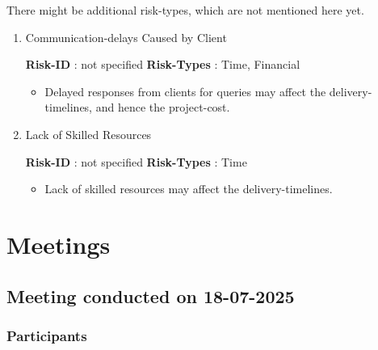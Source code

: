 \documentclass{article}%
\makeatletter
\newcommand{\tinytosmall}{%
  \fontsize
    {\fpeval{(\f@size@tiny+\f@size@small)/2}}
    {\fpeval{(\f@baselineskip@tiny+\f@baselineskip@small)/2}}%
  \selectfont
}
\newcommand{\savecurrentfontsize}{\let\savedlastfontsize\@currsize}
\makeatother
\begin{document}
%
\par%
\savecurrentfontsize%
\begin{mdframed}[style=StopFrame,skipabove=\baselineskip]%
There might be additional risk{-}types, which are not mentioned here yet.%
\end{mdframed}%
\savedlastfontsize%
\begin{enumerate}%
\item%
\hypertarget{ID:885652931}{}%
Communication{-}delays Caused by Client%
\begin{fancybox}{\small \faChevronCircleRight \normalsize \xspace %
\tinytosmall%
\textbf{Risk{-}ID}%
: %
\xspace%
\faChevronLeft not specified\faChevronRight%
\normalsize%
}%
\tinytosmall%
\textbf{Risk{-}Types}%
: %
\xspace%
Time, Financial%
\normalsize%
\begin{itemize}%
\item%
Delayed responses from clients for queries may affect the delivery{-}timelines, and hence the project{-}cost.%
\end{itemize}%
\end{fancybox}%
\item%
\hypertarget{ID:1977501014}{}%
Lack of Skilled Resources%
\begin{fancybox}{\small \faChevronCircleRight \normalsize \xspace %
\tinytosmall%
\textbf{Risk{-}ID}%
: %
\xspace%
\faChevronLeft not specified\faChevronRight%
\normalsize%
}%
\tinytosmall%
\textbf{Risk{-}Types}%
: %
\xspace%
Time%
\normalsize%
\begin{itemize}%
\item%
Lack of skilled resources may affect the delivery{-}timelines.%
\end{itemize}%
\end{fancybox}%
\end{enumerate}%
\hypertarget{ID:1937298063}{}%
\section{Meetings}%

%
\hypertarget{ID:1255543666}{}%
\subsection{Meeting conducted on 18{-}07{-}2025}%

%
\hypertarget{ID:363110175}{}%
\subsubsection{Participants}%
\end{document}
